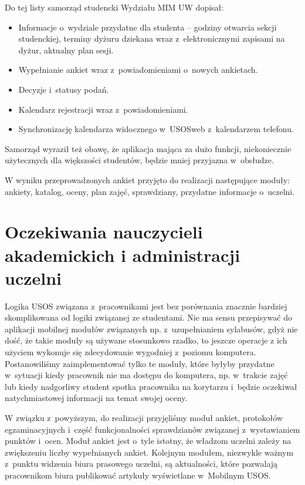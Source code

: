 \documentclass{pracamgr}
\begin{document}
Do tej listy samorząd studencki Wydziału MIM UW dopisał:

\begin{itemize}
	\item Informacje o~wydziale przydatne dla studenta -- godziny otwarcia sekcji
	      studenckiej, terminy dyżuru dziekana wraz z~elektronicznymi zapisami na
	      dyżur, aktualny plan sesji.
	\item Wypełnianie ankiet wraz z~powiadomieniami o~nowych ankietach.
	\item Decyzje i~statusy podań.
	\item Kalendarz rejestracji wraz z~powiadomieniami.
	\item Synchronizację kalendarza widocznego w~USOSweb z~kalendarzem telefonu.
\end{itemize}
Samorząd wyraził też obawę, że aplikacja mająca za dużo funkcji, niekoniecznie
użytecznych dla większości studentów, będzie mniej przyjazna w~obsłudze.

W wyniku przeprowadzonych ankiet przyjęto do realizacji następujące moduły:
ankiety, katalog, oceny, plan zajęć, sprawdziany, przydatne informacje o~uczelni.

\section{Oczekiwania nauczycieli akademickich i administracji uczelni}

Logika USOS związana z~pracownikami jest bez porównania znacznie bardziej
skomplikowana od logiki związanej ze studentami. Nie ma sensu przepisywać do
aplikacji mobilnej modułów związanych np. z~uzupełnianiem sylabusów, gdyż
nie dość, że takie moduły są używane stosunkowo rzadko, to jeszcze operacje
z ich użyciem wykonuje się zdecydowanie wygodniej z~poziomu komputera. Postanowiliśmy
zaimplementować tylko te moduły, które byłyby przydatne w~sytuacji kiedy pracownik
nie ma dostępu do komputera, np. w~trakcie zajęć lub kiedy nadgorliwy student
spotka pracownika na korytarzu i~będzie oczekiwał natychmiastowej
informacji na temat swojej oceny.

W związku z~powyższym, do realizacji przyjęliśmy moduł ankiet, protokołów
egzaminacyjnych i~część funkcjonalności sprawdzianów związanej z~wystawianiem
punktów i~ocen. Moduł ankiet jest o~tyle istotny, że władzom uczelni zależy na
zwiększeniu liczby wypełnianych ankiet. Kolejnym modułem, niezwykle ważnym z~punktu widzenia biura prasowego uczelni, są aktualności, które pozwalają pracownikom
biura publikować artykuły wyświetlane w~Mobilnym USOS.
\end{document}
